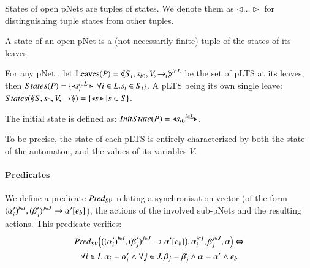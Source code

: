 \documentclass{elsarticle}
\newcommand{\LUDO}[1]{\textcolor{darkgreen}{#1}}
\begin{document}
States of open pNets are tuples of states. We denote them
 as $\triangleleft\ldots\triangleright$ for distinguishing tuple 
states from other tuples.
\begin{definition}\label{def-states}
  A state of an open pNet is a (not necessarily finite) tuple  of the
  states of its leaves.

  For any pNet \pNet, let $\operatorname{Leaves}(P) = \langle\hspace{-0.45ex}\langle S_i,{s_i}_0,V, \to_i\rangle\hspace{-0.45ex}\rangle^{i \in L}$ be 
  the set of pLTS at its leaves,
  then $States(P) = \{\triangleleft s_i^{i\in L}
  \triangleright| \forall i\in L. s_i \in S_i\}$.
A pLTS being its own single leave:
  $States(\langle\hspace{-0.45ex}\langle S,s_0,V, \to\rangle\hspace{-0.45ex}\rangle) = \{\triangleleft s \triangleright| s \in S \}$.  

The initial state is defined as:
$InitState(P) = \triangleleft {{s_i}_0}^{i\in L}  \triangleright$.
\end{definition}
To be precise, the state of each pLTS is entirely characterized by both the state of the automaton, and the values of its variables $V$. 



\paragraph{Predicates} 
 We 
define a
predicate $\Predsv$ relating a synchronisation vector (of the form ${(\alpha'_i)}^{i\in I}, {(\beta'_j)}^{j\in J}\to \alpha' [e_b]$),
the actions of the involved sub-pNets and the resulting actions.
 This predicate verifies:
\begin{multline*}
\Predsv \Big(
\big({\SV{{(\alpha'_i)}^{i\in I}, {(\beta'_j)}^{j\in J}}{\alpha'}{e_b}}\big)
, \alpha_i^{i\in I}, \beta_j^{j\in J}, \alpha\Big)\Leftrightarrow \\
\forall i\in I.\, \alpha_i=\alpha'_i\land \forall j \in J.\, \beta_j=\beta'_j \land 
\alpha=\alpha' 
\land e_b
\end{multline*}
\end{document}
